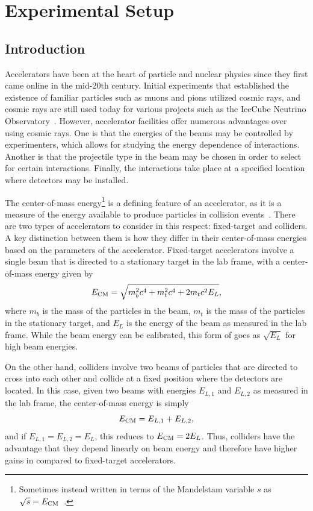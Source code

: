 
\chapter{Experimental Setup}
\label{chap:exp}

\section{Introduction}

Accelerators have been at the heart of particle and nuclear physics since they first came online in the mid-20th century.
Initial experiments that established the existence of familiar particles such as muons and pions utilized cosmic rays, and cosmic rays are still used today for various projects such as the IceCube Neutrino Observatory~\cite{Abbasi_2009}.
However, accelerator facilities offer numerous advantages over using cosmic rays.
One is that the energies of the beams may be controlled by experimenters, which allows for studying the energy dependence of interactions.
Another is that the projectile type in the beam may be chosen in order to select for certain interactions.
Finally, the interactions take place at a specified location where detectors may be installed.

The center-of-mass energy\footnote{Sometimes instead written in terms of the Mandelstam variable $s$ as $\sqrt{s}=E_\mathrm{CM}$~\cite{Perelstein_2011}.} \ECM is a defining feature of an accelerator, as it is a measure of the energy available to produce particles in collision events~\cite{martin2008particle}.
There are two types of accelerators to consider in this respect: fixed-target and colliders.
A key distinction between them is how they differ in their center-of-mass energies based on the parameters of the accelerator.
Fixed-target accelerators involve a single beam that is directed to a stationary target in the lab frame, with a center-of-mass energy given by
\begin{equation}
  E_\mathrm{CM}=\sqrt{m_b^2c^4+m_t^2c^4+2m_tc^2E_L},
\end{equation}
where $m_b$ is the mass of the particles in the beam, $m_t$ is the mass of the particles in the stationary target, and $E_L$ is the energy of the beam as measured in the lab frame.
While the beam energy can be calibrated, this form of \ECM goes as $\sqrt{E_L}$ for high beam energies.

On the other hand, colliders involve two beams of particles that are directed to cross into each other and collide at a fixed position where the detectors are located.
In this case, given two beams with energies $E_{L,1}$ and $E_{L,2}$ as measured in the lab frame, the center-of-mass energy is simply
\begin{equation}
  E_\mathrm{CM}=E_{L,1}+E_{L,2},
\end{equation}
and if $E_{L,1}=E_{L,2}=E_L$, this reduces to $E_\mathrm{CM}=2E_L$.
Thus, colliders have the advantage that they depend linearly on beam energy and therefore have higher gains in \ECM compared to fixed-target accelerators.

